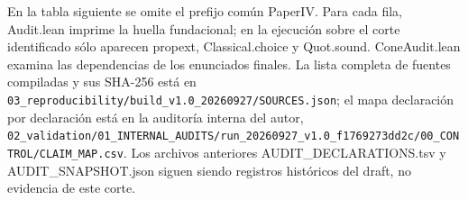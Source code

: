 \documentclass[spanish,11pt,a4paper]{article}
\begin{document}
En la tabla siguiente se omite el prefijo común {\ttfamily\small PaperIV}. Para cada fila, {\ttfamily\small Audit.\discretionary{\hbox{\ensuremath{\hookrightarrow}}}{}{}lean} imprime la huella fundacional; en la ejecución sobre el corte identificado sólo aparecen {\ttfamily\small propext}, {\ttfamily\small Classical.\discretionary{\hbox{\ensuremath{\hookrightarrow}}}{}{}choice} y {\ttfamily\small Quot.\discretionary{\hbox{\ensuremath{\hookrightarrow}}}{}{}sound}. {\ttfamily\small ConeAudit.\discretionary{\hbox{\ensuremath{\hookrightarrow}}}{}{}lean} examina las dependencias de los enunciados finales. La lista completa de fuentes compiladas y sus SHA-256 está en \nolinkurl{03_reproducibility/build_v1.0_20260927/SOURCES.json}; el mapa declaración por declaración está en la auditoría interna del autor, \nolinkurl{02_validation/01_INTERNAL_AUDITS/run_20260927_v1.0_f1769273dd2c/00_CONTROL/CLAIM_MAP.csv}. Los archivos anteriores {\ttfamily\small AUDIT\_\discretionary{\hbox{\ensuremath{\hookrightarrow}}}{}{}DECLARATIONS\discretionary{\hbox{\ensuremath{\hookrightarrow}}}{}{}.\discretionary{\hbox{\ensuremath{\hookrightarrow}}}{}{}tsv} y {\ttfamily\small AUDIT\_\discretionary{\hbox{\ensuremath{\hookrightarrow}}}{}{}SNAPSHOT.\discretionary{\hbox{\ensuremath{\hookrightarrow}}}{}{}json} siguen siendo registros históricos del draft, no evidencia de este corte.
\end{document}
